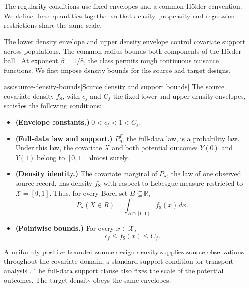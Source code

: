 \documentclass[11pt]{article}
\begin{document}
The regularity conditions use fixed envelopes and a common Hölder convention. We define these quantities together so that density, propensity and regression restrictions share the same scale.



The lower density envelope  and upper density envelope  control covariate support across populations. The common radius  bounds both components of the Hölder ball . At exponent \(\beta=1/8\), the class permits rough continuous nuisance functions. We first impose density bounds for the source and target designs.

\begin{assumptionv}{ass:source-density-bounds}[Source density and support bounds]
The source covariate density \(f_{\mathrm S}\), with \(c_f\) and \(C_f\) the fixed lower and upper density envelopes, satisfies the following conditions:
\begin{itemize}
\item \textbf{(Envelope constants.)} \(0<c_f<1<C_f\).
\item \textbf{(Full-data law and support.)} \(P_n^F\), the full-data law, is a probability law. Under this law, the covariate \(X\) and both potential outcomes \(Y(0)\) and \(Y(1)\) belong to \([0,1]\) almost surely.
\item \textbf{(Density identity.)} The covariate marginal of \(P_{\mathrm S}\), the law of one observed source record, has density \(f_{\mathrm S}\) with respect to Lebesgue measure restricted to \(\mathcal X=[0,1]\). Thus, for every Borel set \(B\subseteq\mathbb R\),
\[
P_{\mathrm S}(X\in B)=\int_{B\cap[0,1]} f_{\mathrm S}(x)\,dx.
\]
\item \textbf{(Pointwise bounds.)} For every \(x\in\mathcal X\),
\[
c_f\le f_{\mathrm S}(x)\le C_f.
\]
\end{itemize}
\end{assumptionv}

A uniformly positive bounded source design density supplies source observations throughout the covariate domain, a standard support condition for transport analysis \citep{ZengKennedyBodnarNaimi2025Efficient}. The full-data support clause also fixes the scale of the potential outcomes. The target density obeys the same envelopes.
\end{document}
